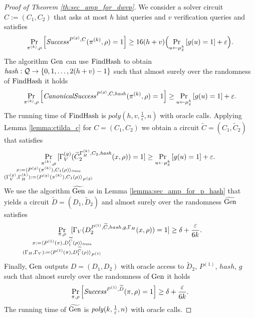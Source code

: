 \begin{proof}[Proof of Theorem \ref{th:sec_amp_for_dwvp}]
We consider a solver circuit $C := (C_1, C_2)$ that asks at most $h$ hint queries and $v$ verification queries and satisfies
\begin{align*}
    \underset{\pi^{(k)}, \rho}{\Pr}\left[\operatorname{\mathit{Success}}^{P^{(g)}, C}(\pi^{(k)}, \rho) = 1\right] \geq 16(h+v)\Big(\underset{u \leftarrow \mu_\delta^k}{\Pr}\left[g(u) = 1\right] + \varepsilon\Big).
\end{align*}
The algorithm $\operatorname{\text{Gen}}$ can use $\operatorname{\text{FindHash}}$ to obtain $\operatorname{\mathit{hash}}:\mathcal{Q} \rightarrow \{0,1,\dotsc, 2(h+v)-1\}$ such that almost surely over the randomness of $\operatorname{\text{FindHash}}$ it holds
\begin{align*}
    \underset{\pi^{(k)}, \rho}{\Pr}\left[\operatorname{\mathit{CanonicalSuccess}}^{P^{(g)}, C, \operatorname{\mathit{hash}}}(\pi^{(k)}, \rho) = 1\right] \geq \underset{u \leftarrow \mu_\delta^k}{\Pr}\left[g(u) = 1\right] + \varepsilon.
\end{align*}
The running time of $\operatorname{\text{FindHash}}$ is $\mathit{poly}(h,v,\frac{1}{\epsilon},n)$ with oracle calls.
Applying Lemma \ref{lemma:ctilda_c} for $C=(C_1, C_2)$ we obtain a circuit $\widetilde{C} = (C_1, \widetilde{C}_2)$ that satisfies
\begin{align*}
    \underset{
      \mathclap {
      \substack{\pi^{(k)}, \rho \\
        x := \langle P^{(g)}(\pi^{(k)}), C_1(\rho) \rangle_{\mathit{trans}} \\
        (\Gamma_V^{(g)}, \Gamma_H^{(k)}) := \langle P^{(g)}(\pi^{(k)}), C_1(\rho) \rangle_{P^{(g)}}
      }}}
    {\Pr}\mkern13mu[\Gamma_V^{(g)}(\widetilde{C}_2^{\Gamma_H^{(k)}, C_2, \hash}(x, \rho)) = 1]
    \geq
\underset{u \leftarrow \mu_\delta^k}{\Pr}\left[g(u) = 1\right] + \varepsilon.
\end{align*}
We use the algorithm $\widetilde{\operatorname{\text{Gen}}}$ as in Lemma \ref{lemma:sec_amp_for_p_hash}
that yields a circuit $\widetilde{D} = (D_1, \widetilde{D}_2)$ and almost surely over the randomness $\widetilde{\operatorname{\text{Gen}}}$ satisfies
\begin{align}
  \label{eq:succ_prob_d}
    \underset{
      \mathclap{
      \substack{\pi, \rho \\ x := \langle P^{(1)}(\pi), D_1^{\widetilde{C}}(\rho) \rangle_{\mathit{trans}} \\
        (\Gamma_H, \Gamma_V) := \langle P^{(1)}(\pi), D_1^{\widetilde{C}}(\rho) \rangle_{P^{(1)}}}}}
    {\Pr}\mkern13mu[\Gamma_V(D_2^{P^{(1)}, \widetilde{C}, hash, g, \Gamma_H}(x, \rho)) = 1] \geq \delta + \frac{\epsilon}{6k}.
\end{align}
Finally, $\operatorname{\text{Gen}}$ outputs $D = (D_1, D_2)$ with oracle access to $\widetilde{D}_2$, $P^{(1)}$, $hash$, $g$ such that almost surely over
the randomness of $\operatorname{\text{Gen}}$ it holds
\begin{align*}
    \underset{\pi, \rho}{\Pr}\left[\operatorname{\mathit{Success}}^{P^{(1)},\widetilde{D}}(\pi, \rho) = 1\right] \geq \delta + \frac{\varepsilon}{6k}.
\end{align*}
The running time of $\widetilde{\operatorname{\text{Gen}}}$ is $\operatorname{\mathit{poly}}(k, \frac{1}{\varepsilon}, n)$ with oracle calls.


\end{proof}
